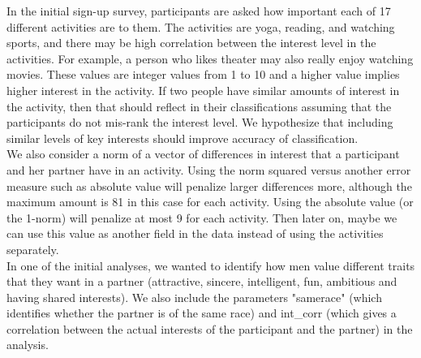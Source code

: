 \documentclass{article}
\begin{document}

In the initial sign-up survey, participants are asked how important each of 17 different activities are to them.  The activities are yoga, reading, and watching sports, and there may be high correlation between the interest level in the activities.  For example, a person who likes theater may also really enjoy watching movies.  These values are integer values from 1 to 10 and a higher value implies higher interest in the activity.  If two people have similar amounts of interest in the activity, then that should reflect in their classifications assuming that the participants do not mis-rank the interest level. We hypothesize that including similar levels of key interests should improve accuracy of classification.\\

We also consider a norm of a vector of differences in interest that a participant and her partner have in an activity.  Using the norm squared versus another error measure such as absolute value will penalize larger differences more, although the maximum amount is 81 in this case for each activity. Using the absolute value (or the 1-norm) will penalize at most 9 for each activity. Then later on, maybe we can use this value as another field in the data instead of using the activities separately. \\

In one of the initial analyses, we wanted to identify how men value different traits that they want in a partner (attractive, sincere, intelligent, fun, ambitious and having shared interests). We also include the parameters "samerace" (which identifies whether the partner is of the same race) and int\_corr (which gives a correlation between the actual interests of the participant and the partner) in the analysis. 
\end{document}
